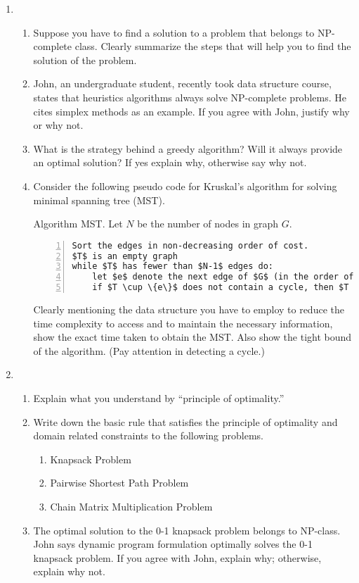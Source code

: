 \begin{enumerate}
	\item \begin{enumerate}
		\item Suppose you have to find a solution to a problem that belongs to NP-complete class.  Clearly summarize the steps that will help you to find the solution of the problem.  
		\item John, an undergraduate student, recently took data structure course, states that heuristics algorithms always solve NP-complete problems.  He cites simplex methods as an example.  If you agree with John, justify why or why not.  
		\item What is the strategy behind a greedy algorithm?  Will it always provide an optimal solution?  If yes explain why, otherwise say why not.  
		\item Consider the following pseudo code for Kruskal's algorithm for solving minimal spanning tree (MST).

Algorithm MST.  Let $N$ be the number of nodes in graph $G$.  

\begin{lstlisting}[numbers=left, mathescape=True]
Sort the edges in non-decreasing order of cost.
$T$ is an empty graph
while $T$ has fewer than $N-1$ edges do:
	let $e$ denote the next edge of $G$ (in the order of cost)
	if $T \cup \{e\}$ does not contain a cycle, then $T = T \cup \{e\}$
\end{lstlisting}

Clearly mentioning the data structure you have to employ to reduce the time complexity to access and to maintain the necessary information, show the exact time taken to obtain the MST.  Also show the tight bound of the algorithm.  (Pay attention in detecting a cycle.)
		
	\end{enumerate}

	\item \begin{enumerate}
		\item Explain what you understand by ``principle of optimality.''
		\item Write down the basic rule that satisfies the principle of optimality and domain related constraints to the following problems.
		\begin{enumerate}
			\item Knapsack Problem
			\item Pairwise Shortest Path Problem
			\item Chain Matrix Multiplication Problem
		\end{enumerate}
		\item The optimal solution to the 0-1 knapsack problem belongs to NP-class.  John says dynamic program formulation optimally solves the 0-1 knapsack problem.  If you agree with John, explain why; otherwise, explain why not.
	\end{enumerate}
	

\end{enumerate}
